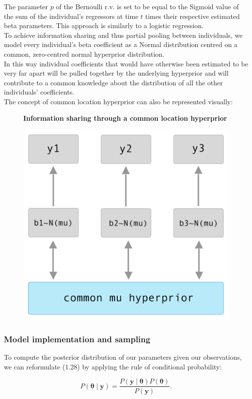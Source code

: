 The parameter $p$ of the Bernoulli r.v. is set to be equal to the Sigmoid value of the sum of the individual's regressors at time $t$ times their respective estimated beta parameters.
This approach is similarly to a logistic regression.\\

To achieve information sharing and thus partial pooling between individuals, we model every individual's beta coefficient as a Normal distribution centred on a common, zero-centred normal hyperprior distribution.\\ In this way individual coefficients that would have otherwise been estimated to be very far apart will be pulled together by the underlying hyperprior and will contribute to a common knowledge about the distribution of all the other individuals' coefficients.\\
The concept of common location hyperprior can also be represented visually:\\

\begin{figure}[H]
\centering \textbf{Information sharing through a common location hyperprior} \par\medskip 
\includegraphics[width=0.4\linewidth]{images/information_sharing.png}
\end{figure}

\subsubsection{Model implementation and sampling} \label{sampling_method}

To compute the posterior distribution of our parameters given our observations, we can reformulate (1.28) by applying the rule of conditional probability: 

\begin{equation}\label{model_impl}
P(\bm{\theta} \mid \bm{y}) = \frac{P(\bm{y} \mid \bm{\theta}) P(\bm{\theta})}{P(\bm{y})}.
\end{equation}

